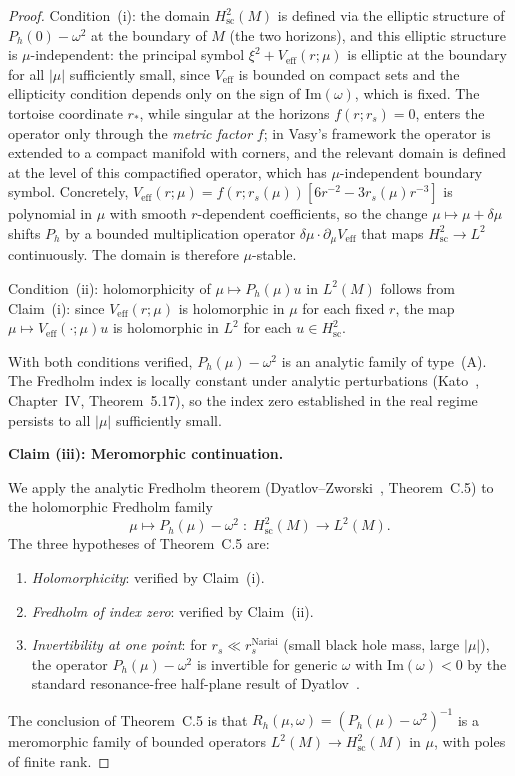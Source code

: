 \documentclass[12pt,a4paper]{amsart}
\theoremstyle{remark}
\begin{document}
\begin{proof}
Condition~(i): the domain $H^2_{\mathrm{sc}}(M)$ is defined via the
elliptic structure of $P_h(0) - \omega^2$ at the boundary of $M$ (the
two horizons), and this elliptic structure is $\mu$-independent: the
principal symbol $\xi^2 + V_{\mathrm{eff}}(r;\mu)$ is elliptic at the
boundary for all $|\mu|$ sufficiently small, since $V_{\mathrm{eff}}$
is bounded on compact sets and the ellipticity condition depends only on
the sign of $\mathrm{Im}(\omega)$, which is fixed.  The tortoise
coordinate $r_*$, while singular at the horizons $f(r;r_s)=0$, enters
the operator only through the \emph{metric factor} $f$; in Vasy's
framework the operator is extended to a compact manifold with corners,
and the relevant domain is defined at the level of this compactified
operator, which has $\mu$-independent boundary symbol.  Concretely,
$V_{\mathrm{eff}}(r;\mu) = f(r;r_s(\mu))[6r^{-2}-3r_s(\mu)r^{-3}]$ is
polynomial in $\mu$ with smooth $r$-dependent coefficients, so the
change $\mu \mapsto \mu + \delta\mu$ shifts $P_h$ by a bounded
multiplication operator $\delta\mu \cdot \partial_\mu V_{\mathrm{eff}}$
that maps $H^2_{\mathrm{sc}} \to L^2$ continuously.  The domain is
therefore $\mu$-stable.

Condition~(ii): holomorphicity of $\mu \mapsto P_h(\mu)u$ in $L^2(M)$
follows from Claim~(i): since $V_{\mathrm{eff}}(r;\mu)$ is holomorphic
in $\mu$ for each fixed $r$, the map $\mu \mapsto V_{\mathrm{eff}}(\cdot;\mu)u$
is holomorphic in $L^2$ for each $u \in H^2_{\mathrm{sc}}$.

With both conditions verified, $P_h(\mu) - \omega^2$ is an analytic
family of type~(A). The Fredholm index is locally constant under
analytic perturbations (Kato~\cite{Kato66}, Chapter~IV, Theorem~5.17),
so the index zero established in the real regime persists to all
$|\mu|$ sufficiently small.

\medskip
\noindent\textbf{Claim (iii): Meromorphic continuation.}

We apply the analytic Fredholm theorem
(Dyatlov--Zworski~\cite{DZ19}, Theorem~C.5) to the holomorphic
Fredholm family
\[
  \mu \mapsto P_h(\mu) - \omega^2 \;:\;
  H^2_{\mathrm{sc}}(M) \to L^2(M).
\]
The three hypotheses of Theorem~C.5 are:
\begin{enumerate}
\item[\textup{(H1)}] \emph{Holomorphicity}: verified by Claim~(i).
\item[\textup{(H2)}] \emph{Fredholm of index zero}: verified by
  Claim~(ii).
\item[\textup{(H3)}] \emph{Invertibility at one point}: for
  $r_s \ll r_s^{\mathrm{Nariai}}$ (small black hole mass, large
  $|\mu|$), the operator $P_h(\mu) - \omega^2$ is invertible for
  generic $\omega$ with $\mathrm{Im}(\omega) < 0$ by the standard
  resonance-free half-plane result of Dyatlov~\cite{Dyatlov11}.
\end{enumerate}
The conclusion of Theorem~C.5 is that $R_h(\mu,\omega) =
(P_h(\mu)-\omega^2)^{-1}$ is a meromorphic family of bounded operators
$L^2(M) \to H^2_{\mathrm{sc}}(M)$ in $\mu$, with poles of finite rank.


\end{proof}
\end{document}
